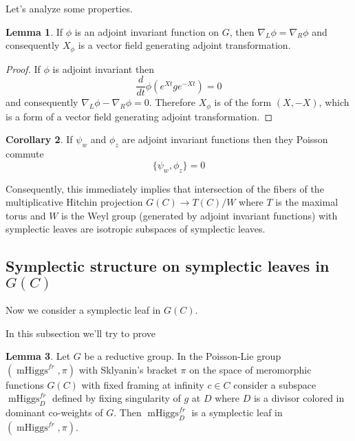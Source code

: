 \documentclass[11pt, oneside, reqno]{amsart}
\theoremstyle{definition} \newtheorem{definition}{Definition}[section]
\newtheorem{lemma}[definition]{Lemma}
\newtheorem{corollary}[definition]{Corollary}
\theoremstyle{definition} \newtheorem{remark}[definition]{Remark}
\theoremstyle{definition} \newtheorem{remarks}[definition]{Remarks}
\theoremstyle{definition} \newtheorem{question}[definition]{Question}
\theoremstyle{definition} \newtheorem*{note}{Note}
\theoremstyle{definition} \newtheorem{example}[definition]{Example}
\theoremstyle{definition} \newtheorem{examples}[definition]{Examples}
\DeclareMathOperator{\mhiggs}{mHiggs}
\begin{document}
Let's analyze some properties. 



\begin{lemma}
 If $\phi$ is an adjoint invariant function on $G$, then
$\nabla_{L} \phi  = \nabla_{R} \phi$ and consequently $X_{\phi}$ is
a vector field generating adjoint transformation. 
\end{lemma}
\begin{proof}
  If $\phi$ is adjoint invariant then
  \begin{equation}
    \frac{d}{dt} \phi(e^{Xt} g e^{-Xt}) = 0
  \end{equation}
  and consequently $\nabla_{L} \phi - \nabla_{R} \phi  = 0$. Therefore $X_{\phi}$ is
  of the form $(X, -X)$, which is a form of a vector field generating adjoint
  transformation. 
\end{proof}

\begin{corollary}
  If $\psi_{w}$ and $\phi_{z}$ are adjoint invariant functions then they Poisson commute 
  \begin{equation}
    \{ \psi_{w}, \phi_{z} \} = 0
  \end{equation}
\end{corollary}

Consequently, this immediately implies that intersection
of the fibers of the multiplicative Hitchin
projection $G(C) \to T(C)/W$ where $T$ is the maximal torus and $W$ is the Weyl group (generated
by adjoint invariant functions) with symplectic leaves are isotropic subspaces of symplectic leaves.





\subsection{Symplectic structure on symplectic leaves in $G(C)$}

Now we consider a symplectic leaf in $G(C)$. 

In this subsection we'll try to prove
\begin{lemma}
Let $G$ be a reductive group.
In the Poisson-Lie group $(\mhiggs^{fr}, \pi)$ with Sklyanin's bracket $\pi$
on the space of meromorphic functions $G(C)$ with fixed framing at infinity $c \in C$
consider a subspace  $\mhiggs^{fr}_{D}$
defined 
  by fixing singularity of $g$ at $D$ where $D$ is a divisor colored in dominant co-weights of $G$. Then $\mhiggs^{fr}_{D}$ is a symplectic leaf in $(\mhiggs^{fr}, \pi)$. 
\end{lemma}
\end{document}
